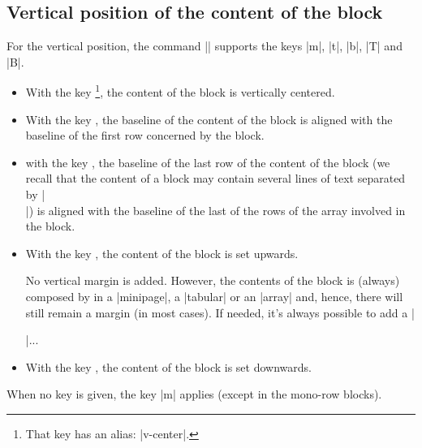 \documentclass[dvipsnames]{article}
\begin{document}
\subsection{Vertical position of the content of the block}

\label{vertical-pos-block}

For the vertical position, the command |\Blocks| supports the keys |m|, |t|,
|b|, |T| and |B|.


\begin{itemize}
\item {} With the key
\footnote{That key has an alias: |v-center|.}, the content of the
block is vertically centered.
\item With the key , the baseline of the content of the block is aligned
with the baseline of the first row concerned by the block.
\item with the key , the baseline of the last row of the content of the
block (we recall that the content of a block may contain several lines of text
separated by |\\|) is aligned with the baseline of the last of the rows of the
array involved in the block.
\item With the key , the content of the block is set upwards. 

No vertical margin is added. However, the contents of the block is (always)
composed by  in a |{minipage}|, a |{tabular}| or an |{array}|
and, hence, there will still remain a margin (in most cases). If needed, it's
always possible to add a |\strut|...

\item With the key , the content of the block is set downwards.
\end{itemize}

When no key is given, the key |m| applies (except in the mono-row blocks).
\end{document}
